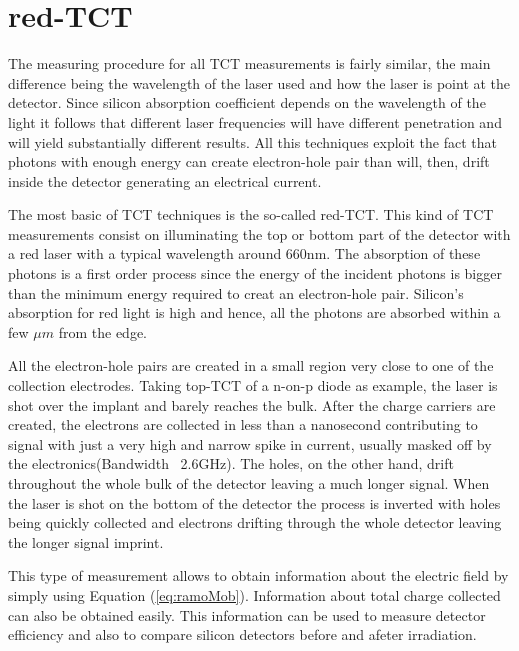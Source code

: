 \section{red-TCT} %
\label{sec:redTCT}

The measuring procedure for all TCT measurements is fairly similar, the main difference being the wavelength of the laser used and how the laser is point at the detector. Since silicon absorption coefficient depends on the wavelength of the light it follows that different laser frequencies will have different penetration and will yield substantially different results. All this techniques exploit the fact that photons with enough energy can create electron-hole pair than will, then, drift inside the detector generating an electrical current. 

The most basic of TCT techniques is the so-called red-TCT. This kind of TCT measurements consist on illuminating the top or bottom part of the detector with a red laser with a typical wavelength around 660nm. The absorption of these photons is a first order process since the energy of the incident photons is bigger than the minimum energy required to creat an electron-hole pair. Silicon's absorption for red light is high and hence, all the photons are absorbed within a few $\mu m$ from the edge. 

All the electron-hole pairs are created in a small region very close to one of the collection electrodes. Taking top-TCT of a n-on-p diode as example, the laser is shot over the implant and barely reaches the bulk. After the charge carriers are created, the electrons are collected in less than a nanosecond contributing to signal with just a very high and narrow spike in current, usually masked off by the electronics(Bandwidth ~2.6GHz). The holes, on the other hand, drift throughout the whole bulk of the detector leaving a much longer signal. When the laser is shot on the bottom of the detector the process is inverted with holes being quickly collected and electrons drifting through the whole detector leaving the longer signal imprint.

This type of measurement allows to obtain information about the electric field by simply using Equation (\ref{eq:ramoMob}). Information about total charge collected can also be obtained easily. This information can be used to measure detector efficiency and also to compare silicon detectors before and afeter irradiation.


